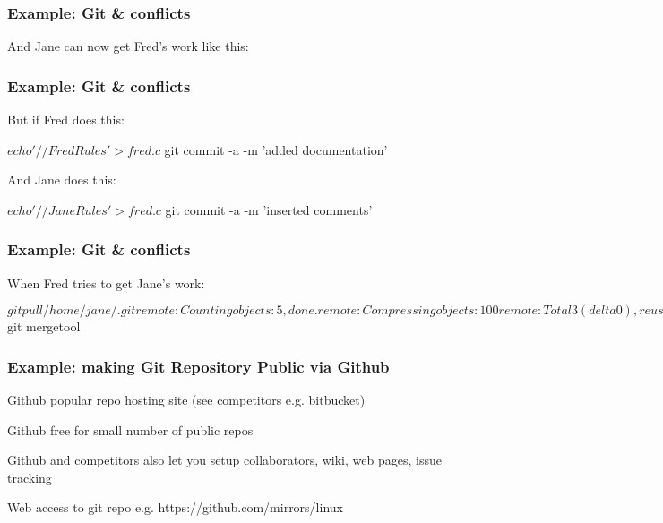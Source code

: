 \begin{frame}[fragile]
\frametitle{Example: Git \& conflicts}
 
And Jane can now get Fred's work like this:

\end{frame}

\begin{frame}
\frametitle{Example: Git \& conflicts}
 
But if Fred  does this:

\begin{sh}
$ echo '// Fred Rules' >fred.c
$ git commit -a  -m 'added documentation'
\end{sh}

And Jane does this:

\begin{sh}
$ echo '// Jane Rules' >fred.c
$ git commit -a  -m 'inserted comments'
\end{sh}
\end{frame}

\begin{frame}
\frametitle{Example: Git \& conflicts}
 

When  Fred tries to get Jane's work:

\begin{sh}
$ git pull /home/jane/.git
remote: Counting objects: 5, done.
remote: Compressing objects: 100%
remote: Total 3 (delta 0), reused 0 (delta 0)
Unpacking objects: 100%
From ../jane/
 * branch            HEAD       -> FETCH_HEAD
Auto-merging fred.c
CONFLICT (content): Merge conflict in fred.c
Automatic merge failed; fix conflicts and then commit the result.
$ git  mergetool
\end{sh}
\end{frame}

\begin{frame}[fragile]
\frametitle{Example: making Git Repository Public via Github}
Github popular repo hosting site (see competitors e.g. bitbucket)

Github free for small number of public repos 

Github and competitors also let you setup collaborators, wiki, web pages, issue tracking

Web access to git repo e.g. https://github.com/mirrors/linux
\end{frame}

